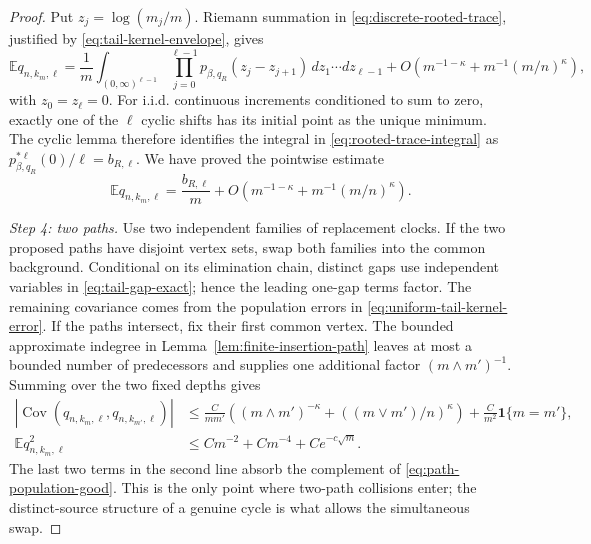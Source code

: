 \documentclass[11pt]{article}
\theoremstyle{remark}
\theoremstyle{plain}
\newcommand{\E}{\mathbb E}
\newcommand{\one}{\mathbf 1}
\begin{document}
\begin{proof}
Put $z_j=\log(m_j/m)$.  Riemann summation in
\eqref{eq:discrete-rooted-trace}, justified by
\eqref{eq:tail-kernel-envelope}, gives
\begin{equation}\label{eq:rooted-trace-integral}
 \E q_{n,k_m,\ell}
 =\frac1m\int_{(0,\infty)^{\ell-1}}
 \prod_{j=0}^{\ell-1}p_{\beta,q_R}(z_j-z_{j+1})
 \,dz_1\cdots dz_{\ell-1}
 +O\left(m^{-1-\kappa}+m^{-1}(m/n)^\kappa\right),
\end{equation}
with $z_0=z_\ell=0$.  For i.i.d. continuous increments conditioned to sum
to zero, exactly one of the $\ell$ cyclic shifts has its initial point as the
unique minimum.  The cyclic lemma therefore identifies the integral in
\eqref{eq:rooted-trace-integral} as
$p_{\beta,q_R}^{*\ell}(0)/\ell=b_{R,\ell}$.  We have proved the pointwise
estimate
\begin{equation}\label{eq:one-path-pointwise}
 \E q_{n,k_m,\ell}
 =\frac{b_{R,\ell}}m
 +O\left(m^{-1-\kappa}+m^{-1}(m/n)^\kappa\right).
\end{equation}

\smallskip
\noindent\emph{Step 4: two paths.}
Use two independent families of replacement clocks.  If the two proposed
paths have disjoint vertex sets, swap both families into the common
background.  Conditional on its elimination chain, distinct gaps use
independent variables in \eqref{eq:tail-gap-exact}; hence the leading
one-gap terms factor.  The remaining covariance comes from the population
errors in \eqref{eq:uniform-tail-kernel-error}.  If the paths intersect,
fix their first common vertex.  The bounded approximate indegree in
Lemma~\ref{lem:finite-insertion-path} leaves at most a bounded number of
predecessors and supplies one additional factor $(m\wedge m')^{-1}$.
Summing over the two fixed depths gives
\begin{align}
 \left|\operatorname{Cov}(q_{n,k_m,\ell},q_{n,k_{m'},\ell})\right|
 &\le \frac{C}{mm'}\left((m\wedge m')^{-\kappa}
       +((m\vee m')/n)^\kappa\right)
   +\frac{C}{m^2}\one\{m=m'\},\label{eq:two-path-pointwise}\\
 \E q_{n,k_m,\ell}^2
 &\le Cm^{-2}+Cm^{-4}+Ce^{-c\sqrt m}.
 \label{eq:path-square-pointwise}
\end{align}
The last two terms in the second line absorb the complement of
\eqref{eq:path-population-good}.  This is the only point where two-path
collisions enter; the distinct-source structure of a genuine cycle is what
allows the simultaneous swap.


\end{proof}
\end{document}
